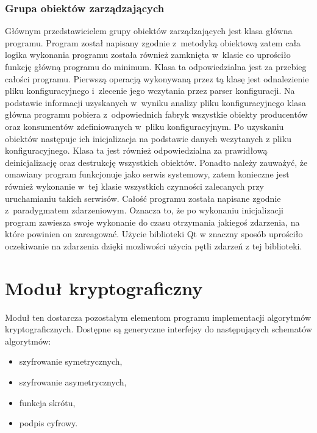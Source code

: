 \subsubsection[Grupa obiektów zarządzających][Grupa obiektów
zarządzających]{Grupa obiektów zarządzających}

Głównym przedstawicielem grupy obiektów zarządzających jest klasa
główna programu. Program został napisany zgodnie z~metodyką obiektową
zatem cała logika wykonania programu została również zamknięta
w~klasie co uprościło funkcję główną programu do minimum. Klasa ta
odpowiedzialna jest za przebieg całości programu. Pierwszą operacją
wykonywaną przez tą klasę jest odnalezienie pliku konfiguracyjnego
i~zlecenie jego wczytania przez parser konfiguracji. Na podstawie
informacji uzyskanych w~wyniku analizy pliku konfiguracyjnego klasa
główna programu pobiera z~odpowiednich fabryk wszystkie obiekty
producentów oraz konsumentów zdefiniowanych w~pliku
konfiguracyjnym. Po uzyskaniu obiektów następuje ich inicjalizacja na
podstawie danych wczytanych z pliku konfiguracyjnego. Klasa ta jest
również odpowiedzialna za prawidłową deinicjalizację oraz destrukcję
wszystkich obiektów. Ponadto należy zauważyć, że omawiany program
funkcjonuje jako serwis systemowy, zatem konieczne jest również
wykonanie w~tej klasie wszystkich czynności zalecanych przy
uruchamianiu takich serwisów. Całość programu została napisane zgodnie
z~paradygmatem zdarzeniowym. Oznacza to, że po wykonaniu inicjalizacji
program zawiesza swoje wykonanie do czasu otrzymania jakiegoś
zdarzenia, na które powinien on zareagować. Użycie biblioteki Qt w
znaczny sposób uprościło oczekiwanie na zdarzenia dzięki mozliwości
użycia pętli zdarzeń z tej biblioteki.

\section[Moduł kryptograficzny][Moduł kryptograficzny]{Moduł kryptograficzny}

Moduł ten dostarcza pozostałym elementom programu implementacji
algorytmów kryptograficznych. Dostępne są generyczne interfejsy do
następujących schematów algorytmów:

\begin{itemize}
\item szyfrowanie symetrycznych,
\item szyfrowanie asymetrycznych,
\item funkcja skrótu,
\item podpis cyfrowy.
\end{itemize}

